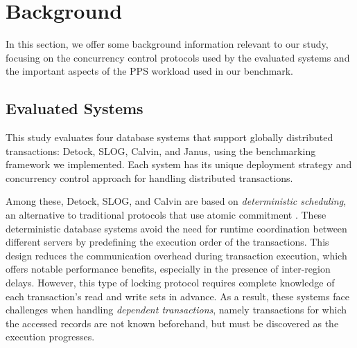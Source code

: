 \section{Background}
\label{sec: background}
In this section, we offer some background information relevant to our study, focusing on the concurrency control protocols used by the evaluated systems and the important aspects of the PPS workload used in our benchmark.

\subsection{Evaluated Systems}
\label{subsec: evaluated-systems}
This study evaluates four database systems that support globally distributed transactions: Detock, SLOG, Calvin, and Janus, using the benchmarking framework we implemented. Each system has its unique deployment strategy and concurrency control approach for handling distributed transactions.

Among these, Detock, SLOG, and Calvin are based on \textit{deterministic scheduling}, an alternative to traditional protocols that use atomic commitment \cite{thomson2010case}. These deterministic database systems avoid the need for runtime coordination between different servers by predefining the execution order of the transactions. This design reduces the communication overhead during transaction execution, which offers notable performance benefits, especially in the presence of inter-region delays. However, this type of locking protocol requires complete knowledge of each transaction's read and write sets in advance. As a result, these systems face challenges when handling \textit{dependent transactions}, namely transactions for which the accessed records are not known beforehand, but must be discovered as the execution progresses.

